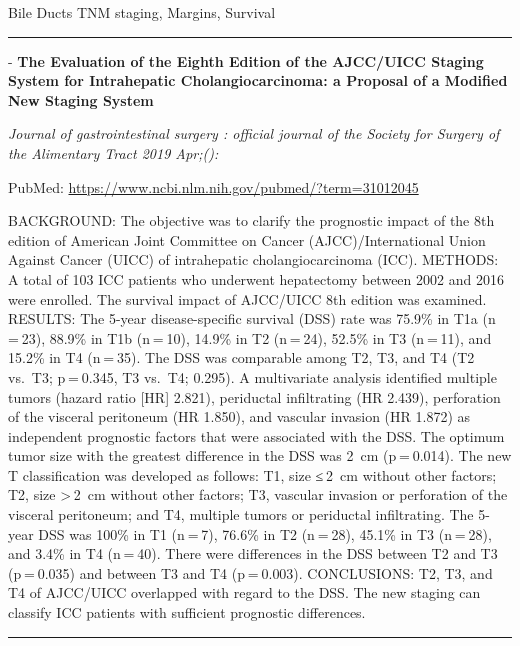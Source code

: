 \documentclass[]{article}
\begin{document}
Bile Ducts TNM staging, Margins, Survival

\begin{center}\rule{0.5\linewidth}{\linethickness}\end{center}

 - \textbf{The Evaluation of the Eighth Edition of the AJCC/UICC Staging
System for Intrahepatic Cholangiocarcinoma: a Proposal of a Modified New
Staging System}

\emph{Journal of gastrointestinal surgery : official journal of the
Society for Surgery of the Alimentary Tract 2019 Apr;():}

PubMed: \url{https://www.ncbi.nlm.nih.gov/pubmed/?term=31012045}

BACKGROUND: The objective was to clarify the prognostic impact of the
8th edition of American Joint Committee on Cancer (AJCC)/International
Union Against Cancer (UICC) of intrahepatic cholangiocarcinoma (ICC).
METHODS: A total of 103 ICC patients who underwent hepatectomy between
2002 and 2016 were enrolled. The survival impact of AJCC/UICC 8th
edition was examined. RESULTS: The 5-year disease-specific survival
(DSS) rate was 75.9\% in T1a (n = 23), 88.9\% in T1b (n = 10), 14.9\% in
T2 (n = 24), 52.5\% in T3 (n = 11), and 15.2\% in T4 (n = 35). The DSS
was comparable among T2, T3, and T4 (T2 vs.~T3; p = 0.345, T3 vs.~T4;
0.295). A multivariate analysis identified multiple tumors (hazard ratio
{[}HR{]} 2.821), periductal infiltrating (HR 2.439), perforation of the
visceral peritoneum (HR 1.850), and vascular invasion (HR 1.872) as
independent prognostic factors that were associated with the DSS. The
optimum tumor size with the greatest difference in the DSS was 2~cm
(p = 0.014). The new T classification was developed as follows: T1, size
≤ 2~cm without other factors; T2, size \textgreater{} 2~cm without other
factors; T3, vascular invasion or perforation of the visceral
peritoneum; and T4, multiple tumors or periductal infiltrating. The
5-year DSS was 100\% in T1 (n = 7), 76.6\% in T2 (n = 28), 45.1\% in T3
(n = 28), and 3.4\% in T4 (n = 40). There were differences in the DSS
between T2 and T3 (p = 0.035) and between T3 and T4 (p = 0.003).
CONCLUSIONS: T2, T3, and T4 of AJCC/UICC overlapped with regard to the
DSS. The new staging can classify ICC patients with sufficient
prognostic differences.

{}

{}

\begin{center}\rule{0.5\linewidth}{\linethickness}\end{center}
\end{document}
